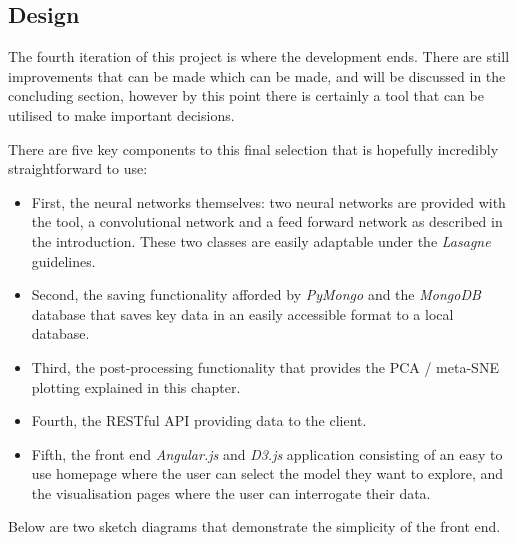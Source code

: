 \documentclass[a4paper,11pt,titlepage]{article}
\begin{document}
	\subsection{Design}
	The fourth iteration of this project is where the development ends. There are still improvements that can be made which can be made, and will be discussed in the concluding section, however by this point there is certainly a tool that can be utilised to make important decisions. 
	\par 
	There are five key components to this final selection that is hopefully incredibly straightforward to use:
	\begin{itemize}
		\item First, the neural networks themselves: two neural networks are provided with the tool, a convolutional network and a feed forward network as described in the introduction. These two classes are easily adaptable under the \textit{Lasagne} guidelines.
		\item Second, the saving functionality afforded by \textit{PyMongo} and the \textit{MongoDB} database that saves key data in an easily accessible format to a local database.
		\item Third, the post-processing functionality that provides the PCA / meta-SNE plotting explained in this chapter. 
		\item Fourth, the RESTful API providing data to the client.
		\item Fifth, the front end \textit{Angular.js} and \textit{D3.js} application consisting of an easy to use homepage where the user can select the model they want to explore, and the visualisation pages where the user can interrogate their data.
	\end{itemize}
	
	Below are two sketch diagrams that demonstrate the simplicity of the front end.
	
		\begin{figure}[H]
    			\centering	
    			\qquad
    			\caption{}%
    			\label{fig:pca_varimax}
	\end{figure}
	
\end{document}
